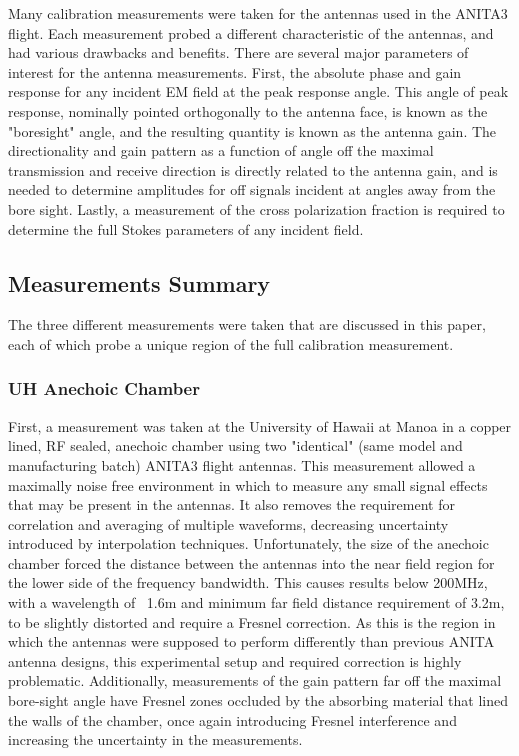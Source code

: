 	Many calibration measurements were taken for the antennas used in the ANITA3 flight.  Each measurement probed a different characteristic of the antennas, and had various drawbacks and benefits.  There are several major parameters of interest for the antenna measurements. First, the absolute phase and gain response for any incident EM field at the peak response angle.  This angle of peak response, nominally pointed orthogonally to the antenna face, is known as the "boresight" angle, and the resulting quantity is known as the antenna gain. The directionality and gain pattern as a function of angle off the maximal transmission and receive direction is directly related to the antenna gain, and is needed to determine amplitudes for off signals incident at angles away from the bore sight.   Lastly, a measurement of the cross polarization fraction is required to determine the full Stokes parameters of any incident field.
	
	\subsection{Measurements Summary}
	
	The three different measurements were taken that are discussed in this paper, each of which probe a unique region of the full calibration measurement.  
	
		\subsubsection{UH Anechoic Chamber}
		First, a measurement was taken at the University of Hawaii at Manoa in a copper lined, RF sealed, anechoic chamber using two "identical" (same model and manufacturing batch) ANITA3 flight antennas.  This measurement allowed a maximally noise free environment in which to measure any small signal effects that may be present in the antennas.  It also removes the requirement for correlation and averaging of multiple waveforms, decreasing uncertainty introduced by interpolation techniques.  Unfortunately, the size of the anechoic chamber forced the distance between the antennas into the near field region for the lower side of the frequency bandwidth.  This causes results below 200MHz, with a wavelength of ~1.6m and minimum far field distance requirement of 3.2m, to be slightly distorted and require a 	Fresnel correction. As this is the region in which the antennas were supposed to perform differently than previous ANITA antenna designs, this experimental setup and required correction is highly problematic.  Additionally, measurements of the gain pattern far off the maximal bore-sight angle have Fresnel zones occluded by the absorbing material that lined the walls of the chamber, once again introducing Fresnel interference and increasing the uncertainty in the measurements.
	
